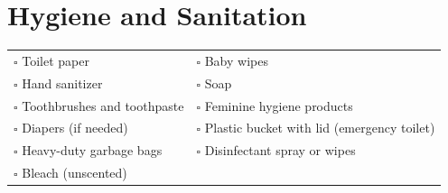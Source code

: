 
\section{Hygiene and Sanitation}
\label{sec:hygiene}

\begin{tabular}{p{9cm} p{9cm}}
$\square$ Toilet paper & $\square$ Baby wipes \\ 
$\square$ Hand sanitizer & $\square$ Soap \\ 
$\square$ Toothbrushes and toothpaste & $\square$ Feminine hygiene products \\ 
$\square$ Diapers (if needed) & $\square$ Plastic bucket with lid (emergency toilet) \\ 
$\square$ Heavy-duty garbage bags & $\square$ Disinfectant spray or wipes \\ 
$\square$ Bleach (unscented) & \\ 
\end{tabular}

